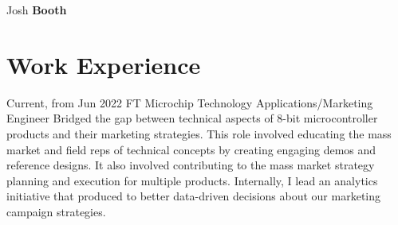 \documentclass[
	10pt, %
]{FreemanCV}
\begin{document}
\begin{paracol}{2} %


\parbox[][0.05\textheight][c]{\linewidth}{ %
	\centering %
	
	{\sffamily\Huge Josh \textbf{Booth}} %
	
	\medskip %
	
	
	\vfill %
}

\vspace*{-4pt}
\section{Work Experience}





\jobentry
	{Current, from Jun 2022} %
	{FT} %
	{Microchip Technology} %
	{Applications/Marketing Engineer} %
	{ %
		Bridged the gap between technical aspects of 8-bit microcontroller products and their marketing strategies.
		This role involved educating the mass market and field reps of technical concepts by creating engaging demos and reference designs.
		It also involved contributing to the mass market strategy planning and execution for multiple products.
		Internally, I lead an analytics initiative that produced to better data-driven decisions about our marketing campaign strategies.
	} 


\end{paracol}
\end{document}

